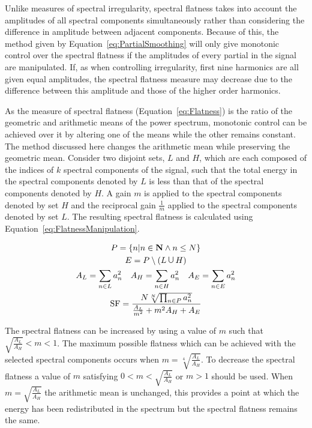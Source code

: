 		Unlike measures of spectral irregularity, spectral flatness takes into account the amplitudes of all
		spectral components simultaneously rather than considering the difference in amplitude between adjacent
		components. Because of this, the method given by Equation~\ref{eq:PartialSmoothing} will only give
		monotonic control over the spectral flatness if the amplitudes of every partial in the signal are
		manipulated. If, as when controlling irregularity, first nine harmonics are all given equal amplitudes, the
		spectral flatness measure may decrease due to the difference between this amplitude and those of the higher
		order harmonics.

		As the measure of spectral flatness (Equation~\ref{eq:Flatness}) is the ratio of the geometric and
		arithmetic means of the power spectrum, monotonic control can be achieved over it by altering one of the
		means while the other remains constant. The method discussed here changes the arithmetic mean while
		preserving the geometric mean. Consider two disjoint sets, $L$ and $H$, which are each composed of the
		indices of $k$ spectral components of the signal, such that the total energy in the spectral components
		denoted by $L$ is less than that of the spectral components denoted by $H$. A gain $m$ is applied to the
		spectral components denoted by set $H$ and the reciprocal gain $\frac{1}{m}$ applied to the spectral
		components denoted by set $L$. The resulting spectral flatness is calculated using
		Equation~\ref{eq:FlatnessManipulation}.

		\begin{gather}
			P = \left\{ n | n \in \textbf{N} \land n \leq N \right\} \nonumber \\
			E = P \setminus (L \medcup H) \nonumber \\
			A_{L} = \sum_{n \in L} a_{n}^{2} \quad A_{H} = \sum_{n \in H} a_{n}^{2}
			   \quad A_{E} = \sum_{n \in E} a_{n}^{2} \nonumber \\
			\mathrm{SF} = \frac{N\sqrt[N]{\prod_{n \in P} a_{n}^{2}}}
					   {\frac{A_{L}}{m^{2}} + m^{2}A_{H} + A_{E}}
			\label{eq:FlatnessManipulation}
		\end{gather}

		The spectral flatness can be increased by using a value of $m$ such that $\sqrt{\frac{A_{L}}{A_{H}}} < m <
		1$. The maximum possible flatness which can be achieved with the selected spectral components occurs when
		$m = \sqrt[4]{\frac{A_{L}}{A_{H}}}$. To decrease the spectral flatness a value of $m$ satisfying $0 < m <
		\sqrt{\frac{A_{L}}{A_{H}}}$ or $m > 1$ should be used. When $m = \sqrt{\frac{A_{L}}{A_{H}}}$ the arithmetic
		mean is unchanged, this provides a point at which the energy has been redistributed in the spectrum but the
		spectral flatness remains the same. 

